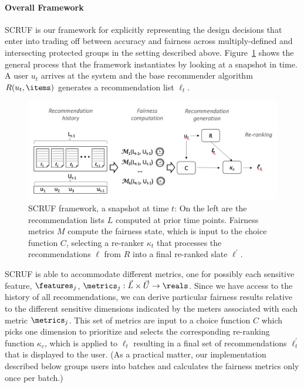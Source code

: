 \noindent \paragraph{Overall Framework} \newline
\indent SCRUF is our framework for explicitly representing the design decisions that enter into trading off between accuracy and fairness across multiply-defined and intersecting protected groups in the setting described above. Figure~\ref{fig:framework} shows the general process that the framework instantiates by looking at a snapshot in time. A user $u_t$ arrives at the system and the base recommender algorithm $R(u_t,\items)$ generates a recommendation list $\ell_t$. 

\begin{figure}[tb]
    \centering
    \includegraphics[width=5.5in]{imgs/dynfair/process-graphic.png}
    \caption{SCRUF framework, a snapshot at time $t$: On the left are the recommendation lists $L$ computed at prior time points. Fairness metrics $M$ compute the fairness state, which is input to the choice function $C$, selecting a re-ranker $\kappa_t$ that processes the recommendations $\ell$ from $R$ into a final re-ranked slate $\ell^{\prime}$.}
    \label{fig:framework}
\end{figure}

SCRUF is able to accommodate different metrics, one for possibly each sensitive feature, $\features_j$, $\metrics_j: \vec{L} \times \vec{U} \rightarrow \reals$.  Since we have access to the history of all recommendations, we can derive particular fairness results relative to the different sensitive dimensions indicated by the meters associated with each metric $\metrics_j$. This set of metrics are input to a choice function $C$ which picks one dimension to prioritize and selects the corresponding re-ranking function $\kappa_c$, which is applied to $\ell_t$ resulting in a final set of recommendations $\ell^{\prime}_t$ that is displayed to the user. (As a practical matter, our implementation described below groups users into batches and calculates the fairness metrics only once per batch.)

